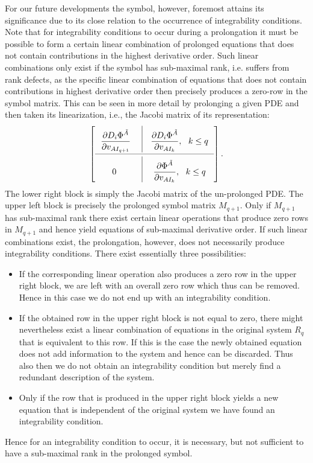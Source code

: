For our future developments the symbol, however, foremost attains its significance due to its close relation to the occurrence of integrability conditions.
Note that for integrability conditions to occur during a prolongation it must be possible to form a certain linear combination of prolonged equations that does not contain contributions in the highest derivative order. Such linear combinations only exist if the symbol has sub-maximal rank, i.e. suffers from rank defects, as the specific linear combination of equations that does not contain contributions in highest derivative order then precisely produces a zero-row in the symbol matrix. This can be seen in more detail by prolonging a given PDE and then taken its linearization, i.e., the Jacobi matrix of its representation:
\begin{align}
\def\arraystretch{2.5}
\begin{bmatrix}
      \ \ \mathlarger{{\frac{\partial D_i\Phi^{\tilde{A}}}{\partial v_{AI_{q+1}}}}} \ & \vline & \mathlarger{\frac{\partial D_i \Phi^{\tilde{A}}}{\partial v_{AI_k}}}, \ \ k \leq q \ \  \\
        \cmidrule(lr){1-3}
        \mathlarger{0} & \vline & \mathlarger{\frac{\partial \Phi^{\tilde{A}}}{\partial v_{AI_k}}}, \ \ k \leq q \ \
\end{bmatrix}.
\end{align}
The lower right block is simply the Jacobi matrix of the un-prolonged PDE. The upper left block is precisely the prolonged symbol matrix $M_{q+1}$. Only if $M_{q+1}$ has sub-maximal rank there exist certain linear operations that produce zero rows in $M_{q+1}$ and hence yield equations of sub-maximal derivative order. If such linear combinations exist, the prolongation, however, does not necessarily produce integrability conditions.
There exist essentially three possibilities:
\begin{itemize}
    \item If the corresponding linear operation also produces a zero row in the upper right block, we are left with an overall zero row which thus can be removed. 
    Hence in this case we do not end up with an integrability condition.\\
    \item If the obtained row in the upper right block is not equal to zero, there might nevertheless exist a linear combination of equations in the original system $R_q$ that is equivalent to this row. 
    If this is the case the newly obtained equation does not add information to the system and hence can be discarded. Thus also then we do not obtain an integrability condition but merely find a redundant description of the system.\\
    \item Only if the row that is produced in the upper right block yields a new equation that is independent of the original system we have found an integrability condition.  
\end{itemize}
Hence for an integrability condition to occur, it is necessary, but not sufficient to have a sub-maximal rank in the prolonged symbol.

